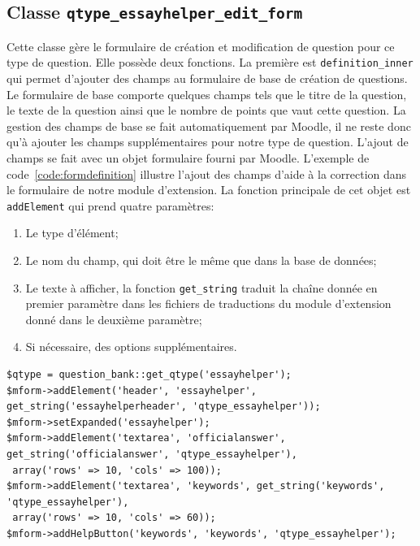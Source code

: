 \subsection*{Classe \texttt{qtype\_essayhelper\_edit\_form}}
Cette classe g\`ere le formulaire de cr\'eation et modification de question pour ce type de question.
Elle poss\`ede deux fonctions. La premi\`ere est \texttt{definition\_inner} qui permet d'ajouter des champs au formulaire de base de cr\'eation de questions.
Le formulaire de base comporte quelques champs tels que le titre de la question, le texte de la question ainsi que le nombre de points que vaut cette question.
La gestion des champs de base se fait automatiquement par Moodle, il ne reste donc qu'\`a ajouter les champs suppl\'ementaires pour notre type de question.
L'ajout de champs se fait avec un objet formulaire fourni par Moodle.
L'exemple de code~\ref{code:formdefinition} illustre l'ajout des champs d'aide \`a la correction dans le formulaire de notre module d'extension.
La fonction principale de cet objet est \texttt{addElement} qui prend quatre param\`etres:
\begin{enumerate}
  \item Le type d'\'el\'ement;
  \item Le nom du champ, qui doit \^etre le m\^eme que dans la base de donn\'ees;
  \item Le texte \`a afficher, la fonction \texttt{get\_string} traduit la cha\^ine donn\'ee en premier param\`etre dans les fichiers de traductions du module d'extension donn\'e dans le deuxi\`eme param\`etre;
  \item Si n\'ecessaire, des options suppl\'ementaires.
\end{enumerate}
\begin{lstfloat}
\begin{lstlisting}[frame=l]
$qtype = question_bank::get_qtype('essayhelper');
$mform->addElement('header', 'essayhelper', get_string('essayhelperheader', 'qtype_essayhelper'));
$mform->setExpanded('essayhelper');
$mform->addElement('textarea', 'officialanswer', get_string('officialanswer', 'qtype_essayhelper'),
 array('rows' => 10, 'cols' => 100));
$mform->addElement('textarea', 'keywords', get_string('keywords', 'qtype_essayhelper'),
 array('rows' => 10, 'cols' => 60));
$mform->addHelpButton('keywords', 'keywords', 'qtype_essayhelper');
\end{lstlisting}
\caption{Extrait du code de la fonction \texttt{definition\_inner} de la classe \texttt{qtype\_essayhelper\_edit\_form}.}
\label{code:formdefinition}
\end{lstfloat}
